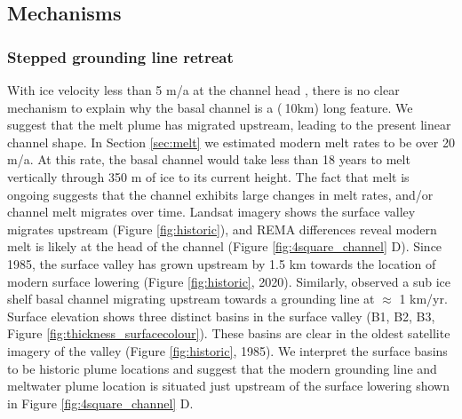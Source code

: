 \subsection{Mechanisms} \label{sec:shape}
\subsubsection{Stepped grounding line retreat} \label{sec:retreat}

With ice velocity less than 5 m/a at the channel head \citep{rignot2017measures},  there is no clear mechanism to explain why the basal channel is a ($\>$10km) long feature. We suggest that the melt plume has migrated upstream, leading to the present linear channel shape.  
In Section \ref{sec:melt} we estimated modern melt rates to be over 20 m/a. At this rate, the basal channel would take less than 18 years to melt vertically through 350 m of ice to its current height.  The fact that melt is ongoing suggests that the channel exhibits large changes in melt rates, and/or channel melt migrates over time. Landsat imagery shows the surface valley migrates upstream (Figure \ref{fig:historic}), and REMA differences reveal modern melt is likely at the head of the channel (Figure \ref{fig:4square_channel} D).   Since 1985, the surface valley has grown upstream by 1.5 km towards the location of modern surface lowering (Figure \ref{fig:historic}, 2020).
Similarly, \cite{chartrand2020basal} observed a sub ice shelf basal channel migrating upstream towards a grounding line at $\approx$ 1 km/yr.
Surface elevation shows three distinct basins in the surface valley (B1, B2, B3, Figure \ref{fig:thickness_surfacecolour}). These basins are clear in the oldest satellite imagery of the valley (Figure \ref{fig:historic}, 1985). We interpret the surface basins to be historic plume locations and suggest that the modern grounding line and meltwater plume location is situated just upstream of the surface lowering shown in Figure \ref{fig:4square_channel} D. 

